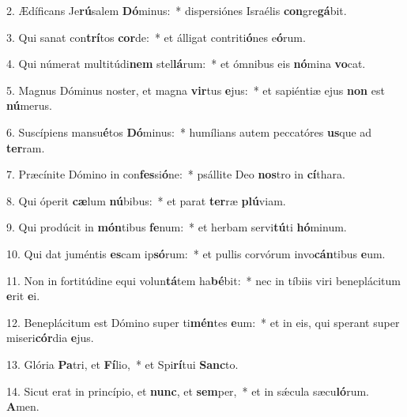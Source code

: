 2. Ædíficans Je\textbf{rú}salem \textbf{Dó}minus:~*  dispersiónes Israélis \textbf{con}gre\textbf{gá}bit.\

3. Qui sanat con\textbf{trí}tos \textbf{cor}de:~*  et álligat contriti\textbf{ó}nes e\textbf{ó}rum.\

4. Qui númerat multitúdi\textbf{nem} stel\textbf{lá}rum:~*  et ómnibus eis \textbf{nó}mina \textbf{vo}cat.\

5. Magnus Dóminus noster, et magna \textbf{vir}tus \textbf{e}jus:~*  et sapiéntiæ ejus \textbf{non} est \textbf{nú}merus.\

6. Suscípiens mansu\textbf{é}tos \textbf{Dó}minus:~*  humílians autem peccatóres \textbf{us}que ad \textbf{ter}ram.\

7. Præcínite Dómino in con\textbf{fes}si\textbf{ó}ne:~*  psállite Deo \textbf{nos}tro in \textbf{cí}thara.\

8. Qui óperit \textbf{cæ}lum \textbf{nú}bibus:~*  et parat \textbf{ter}ræ \textbf{plú}viam.\

9. Qui prodúcit in \textbf{món}tibus \textbf{fe}num:~*  et herbam servi\textbf{tú}ti \textbf{hó}minum.\

10. Qui dat juméntis \textbf{es}cam ip\textbf{só}rum:~*  et pullis corvórum invo\textbf{cán}tibus \textbf{e}um.\

11. Non in fortitúdine equi volun\textbf{tá}tem ha\textbf{bé}bit:~*  nec in tíbiis viri beneplácitum \textbf{e}rit \textbf{e}i.\

12. Beneplácitum est Dómino super ti\textbf{mén}tes \textbf{e}um:~*  et in eis, qui sperant super miseri\textbf{cór}dia \textbf{e}jus.\

13. Glória \textbf{Pa}tri, et \textbf{Fí}lio,~*  et Spi\textbf{rí}tui \textbf{Sanc}to.\

14. Sicut erat in princípio, et \textbf{nunc}, et \textbf{sem}per,~*  et in sǽcula sæcu\textbf{ló}rum. \textbf{A}men.\

